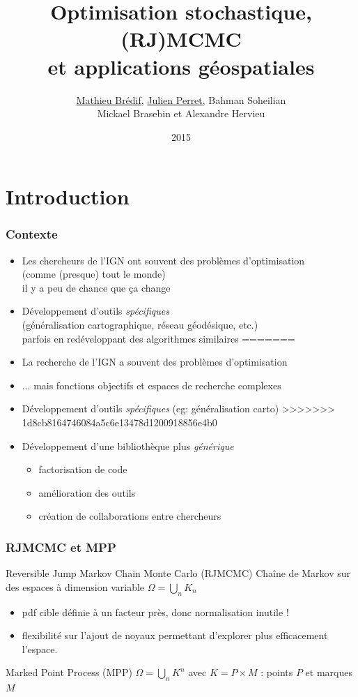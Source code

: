 \documentclass{beamer}
\title{Optimisation stochastique, (RJ)MCMC\\ et applications g\'eospatiales}
\author{\underline{Mathieu Brédif}, \underline{Julien Perret}, Bahman Soheilian\\Mickael Brasebin et Alexandre Hervieu}
\institute{IGN}
\date{2015}
\begin{document}
\frame{\titlepage}
 
 
\section{Introduction}

\begin{frame}
\frametitle{Contexte}
\begin{itemize}
<<<<<<< HEAD
\item Les chercheurs de l'IGN ont souvent des probl\`emes d'optimisation\\
(comme (presque) tout le monde)\\
il y a peu de chance que \c{c}a change 
\item D\'eveloppement d'outils \emph{sp\'ecifiques}\\
(g\'en\'eralisation cartographique, r\'eseau g\'eod\'esique, etc.)\\
parfois en redéveloppant des algorithmes similaires
=======
\item La recherche de l'IGN a souvent des probl\`emes d'optimisation
\item ... mais fonctions objectifs et espaces de recherche complexes
\item D\'eveloppement d'outils \emph{sp\'ecifiques} (eg: g\'en\'eralisation carto)
>>>>>>> 1d8cb8164746084a5c6e13478d1200918856e4b0
\item D\'eveloppement d'une biblioth\`eque plus \emph{g\'en\'erique}
\begin{itemize}
\item factorisation de code
\item am\'elioration des outils
\item cr\'eation de collaborations entre chercheurs
\end{itemize}
\end{itemize}
\end{frame}


\begin{frame}
\frametitle{RJMCMC et MPP}
\begin{block}{Reversible Jump Markov Chain Monte Carlo (RJMCMC)}
Chaîne de Markov sur des espaces à dimension variable $\Omega=\bigcup_n K_n$
\begin{itemize}
\item pdf cible définie à un facteur près, donc normalisation inutile !
\item flexibilité sur l'ajout de noyaux permettant d'explorer plus efficacement l'espace.
\end{itemize}
\end{block}

\begin{block}{Marked Point Process (MPP)}
$\Omega=\bigcup_n K^n$ avec $K=P\times M$ : points $P$ et marques $M$
\end{block}
\end{frame}
\end{document}
